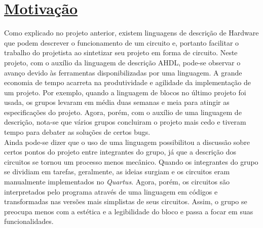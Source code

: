 \documentclass[14pt, oneside]{book}
\newcommand\tab[1][1cm]{\hspace*{#1}}
\theoremstyle{definition}
\begin{document}
        \chapter[Motivação]{\hyperlink{toc}{Motivação}}
            \tab Como explicado no projeto anterior, existem linguagens de descrição de Hardware que podem descrever o funcionamento de um circuito e, portanto facilitar o trabalho do projetista ao sintetizar seu projeto em forma de circuito. Neste projeto, com o auxílio da linguagem de descrição AHDL, pode-se observar o avanço devido às ferramentas disponibilizadas por uma linguagem. A grande economia de tempo acarreta na produtividade e agilidade da implementação de um projeto. Por exemplo, quando a linguagem de blocos no último projeto foi usada, os grupos levaram em média duas semanas e meia para atingir as especificações do projeto. Agora, porém, com o auxílio de uma linguagem de descrição, nota-se que vários grupos concluiram o projeto mais cedo e tiveram tempo para debater as soluções de certos bugs. \\
	        \tab Ainda pode-se dizer que o uso de uma linguagem possibilitou a discussão sobre certos pontos do projeto entre integrantes do grupo, já que a descrição dos circuitos se tornou um processo menos mecânico. Quando os integrantes do grupo se dividiam em tarefas, geralmente, as ideias surgiam e os circuitos eram manualmente implementados no \textit{Quartus}. Agora, porém, os circuitos são interpretados pelo programa através de uma linguagem em códigos e transformadas nas versões mais simplistas de seus circuitos. Assim, o grupo se preocupa menos com a estética e a legibilidade do bloco e passa a focar em suas funcionalidades. \\
	        
           
            
\end{document}
